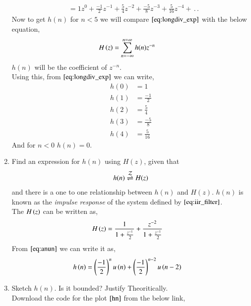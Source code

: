 \documentclass[journal,12pt,twocolumn]{IEEEtran}
\renewcommand\thesection{\arabic{section}}
\begin{document}
\begin{enumerate}[label=\thesection.\arabic*]
\begin{align}
                 & = 1z^{0} + \frac{-1}{2}z^{-1} +\frac{5}{4}z^{-2} + \frac{-5}{8}z^{-3} +\frac{5}{16}z^{-4} + \,.\,.  \label{eq:longdiv_exp}
           \end{align}
           Now to get $h(n)$ for $n <5$ we will compare $\eqref{eq:longdiv_exp}$ with the below equation,
           \begin{align}
                H\left(z\right) & = \sum_{n = -\infty}^{n = \infty}h(n)z^{-n}
           \end{align}
           $h(n)$ will be the coefficient of $z^{-n}$.\\
           Using this, from $\eqref{eq:longdiv_exp}$ we can write,
           \begin{align}
                h(0) & = 1            \\
                h(1) & = \frac{-1}{2} \\
                h(2) & = \frac{5}{4}  \\
                h(3) & = \frac{-5}{8} \\
                h(4) & = \frac{5}{16}
           \end{align}
           And for $n<0\,\, h(n) = 0$.
     \item \label{prob:impulse_resp}
           Find an expression for $h(n)$ using $H(z)$, given that
           \begin{equation}
                \label{eq:impulse_resp}
                h(n) \overset{\mathcal{Z}}{ \rightleftharpoons} H(z)
           \end{equation}
           and there is a one to one relationship between $h(n)$ and $H(z)$. $h(n)$ is known as the {\em impulse response} of the system defined by $\eqref{eq:iir_filter}$.\\
           \solution The $H\left(z\right)$ can be written as,
           \begin{align}
                H\left(z\right) & = \frac{1}{1 + \frac{z^{-1}}{2}} + \frac{z^{-2}}{1+\frac{z^{-1}}{2}}
           \end{align}
           From $\eqref{eq:anun}$ we can write it as,
           \begin{align}
                h\left(n\right) & = \left(\frac{-1}{2}\right)^{n} u\left(n\right) + \left(\frac{-1}{2}\right)^{n-2} u\left(n-2\right)\label{eq:hn}
           \end{align}
     \item Sketch $h(n)$. Is it bounded? Justify Theoritically.\\
           \solution  Download the code for the plot $\ref{hn}$ from the below link,
           \begin{lstlisting}

\end{lstlisting}
\end{enumerate}
\end{document}
